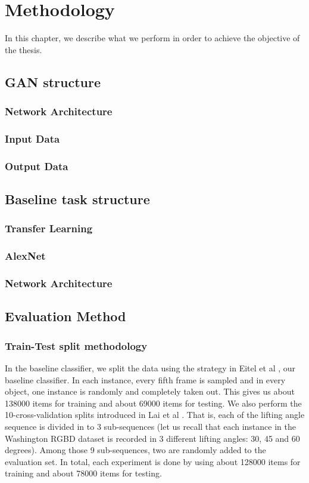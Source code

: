 \chapter{Methodology\label{cha:methodology}}
In this chapter, we describe what we perform in order to achieve the objective of the
thesis.

\section{GAN structure}
\subsection{Network Architecture}
\subsection{Input Data}
\subsection{Output Data}
\section{Baseline task structure}
\subsection{Transfer Learning}
\subsection{AlexNet}
\subsection{Network Architecture}
\section{Evaluation Method}
\subsection{Train-Test split methodology\label{sec:train_test_split}}
In the baseline classifier, we split the data using the strategy in Eitel et al , our baseline classifier. In each instance, every fifth frame is sampled and in
every object, one instance is randomly and completely taken out. This gives us about
138000 items for training and about 69000 items for testing.  We also perform the
10-cross-validation splits introduced in Lai et al .  That is, each of the
lifting angle sequence is divided in to 3 sub-sequences (let us recall that each instance
in the Washington RGBD dataset is recorded in 3 different lifting angles: 30, 45 and 60
degrees).  Among those 9 sub-sequences, two are randomly added to the evaluation set. In
total, each experiment is done by using about 128000 items for training and about 78000
items for testing.

